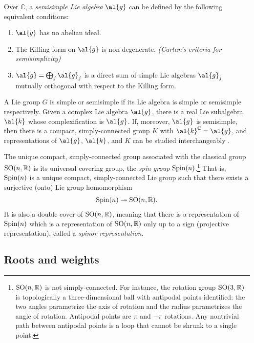 Over $\mathbb{C}$, a \emph{semisimple Lie algebra} $\al{g}$ can be defined by the following equivalent conditions: \cite[p.89]{Procesi}
\begin{enumerate}
	\item $\al{g}$ has no abelian ideal.
	\item  The Killing form on $\al{g}$ is non-degenerate. \emph{(Cartan's criteria for semisimplicity)}
	\item $\al{g} = \bigoplus_j \al{g}_j$ is a direct sum of simple Lie algebras $\al{g}_j$ mutually orthogonal with respect to the Killing form.
\end{enumerate}
A Lie group $G$ is simple or semisimple if its Lie algebra is simple or semisimple respectively. Given a complex Lie algebra $\al{g}$, there is a real Lie subalgebra $\al{k}$ whose complexification is $\al{g}$. If, moreover, $\al{g}$ is semisimple, then there is a compact, simply-connected group $K$ with $\al{k}^{\mathbb{C}} = \al{g}$, and representations of $\al{g}$, $\al{k}$, and $K$ can be studied interchangeably \cite[p.112]{Kirillov}.

The unique compact, simply-connected group associated with the classical group $\text{SO}(n,\mathbb{R})$ is its universal covering group, the \emph{spin group} $\text{Spin}(n)$.\footnote{$\text{SO}(n,\mathbb{R})$ is not simply-connected. For instance, the rotation group $\text{SO}(3,\mathbb{R})$ is topologically a three-dimensional ball with antipodal points identified: the two angles parametrize the axis of rotation and the radius parametrizes the angle of rotation. Antipodal points are $\pi$ and $-\pi$ rotations. Any nontrivial path between antipodal points is a loop that cannot be shrunk to a single point.}
That is, $\text{Spin}(n)$ is a unique compact, simply-connected Lie group such that there exists a surjective (onto) Lie group homomorphism
\begin{align}\label{def:spin-group}
	\gr{Spin}{n} \twoheadrightarrow \gr{SO}{n,\mathbb{R}}.
\end{align}
It is also a double cover of $\text{SO}(n,\mathbb{R})$, meaning that there is a representation of $\text{Spin}(n)$ which is a representation of $\text{SO}(n,\mathbb{R})$ only up to a sign (projective representation), called a \emph{spinor representation}.

\subsection{Roots and weights}\label{ch2:root}

